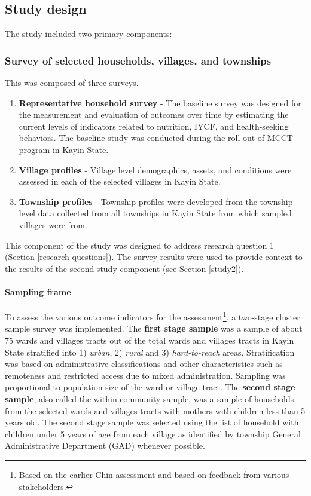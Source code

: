 \documentclass[12pt,a4paper]{article}
\let\oldparagraph\paragraph
\renewcommand{\paragraph}[1]{\oldparagraph{#1}\mbox{}}
\let\rmarkdownfootnote\footnote%
\def\footnote{\protect\rmarkdownfootnote}
\begin{document}
\hypertarget{design}{%
\subsection{Study design}\label{design}}

The study included two primary components:

\hypertarget{study1}{%
\subsubsection{Survey of selected households, villages, and townships}\label{study1}}

This was composed of three surveys.

\begin{enumerate}
\def\labelenumi{\arabic{enumi}.}
\item
  \textbf{Representative household survey} - The baseline survey was designed for the measurement and evaluation of outcomes over time by estimating the current levels of indicators related to nutrition, IYCF, and health-seeking behaviors. The baseline study was conducted during the roll-out of MCCT program in Kayin State.
\item
  \textbf{Village profiles} - Village level demographics, assets, and conditions were assessed in each of the selected villages in Kayin State.
\item
  \textbf{Township profiles} - Township profiles were developed from the township-level data collected from all townships in Kayin State from which sampled villages were from.
\end{enumerate}

This component of the study was designed to address research question 1 (Section \ref{research-questions}). The survey results were used to provide context to the results of the second study component (see Section \ref{study2}).

\hypertarget{sampling-frame}{%
\paragraph{Sampling frame}\label{sampling-frame}}

To assess the various outcome indicators for the assessment\footnote{Based on the earlier Chin assessment and based on feedback from various stakeholders.}, a two-stage cluster sample survey was implemented. The \textbf{first stage sample} was a sample of about 75 wards and villages tracts out of the total wards and villages tracts in Kayin State stratified into 1) \emph{urban}, 2) \emph{rural} and 3) \emph{hard-to-reach} areas. Stratification was based on administrative classifications and other characteristics such as remoteness and restricted access due to mixed administration. Sampling was proportional to population size of the ward or village tract. The \textbf{second stage sample}, also called the within-community sample, was a sample of households from the selected wards and villages tracts with mothers with children less than 5 years old. The second stage sample was selected using the list of household with children under 5 years of age from each village as identified by township General Administrative Department (GAD) whenever possible.
\end{document}
